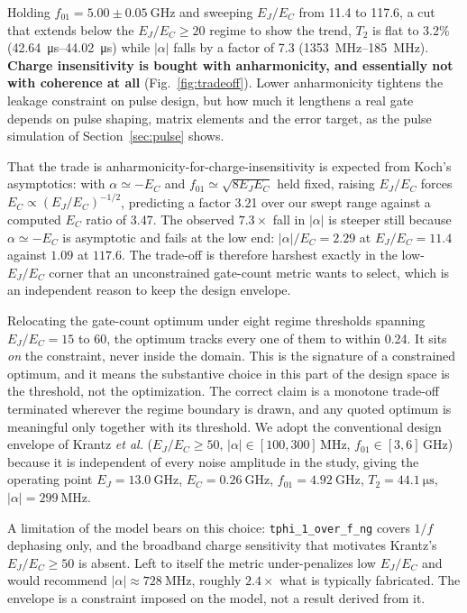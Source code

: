 \documentclass{SciPost}
\begin{document}
Holding $f_{01} = 5.00 \pm \SI{0.05}{\giga\hertz}$ and sweeping $E_J/E_C$ from 11.4 to 117.6, a cut
that extends below the $E_J/E_C\ge20$ regime to show the trend,
$T_2$ is flat to 3.2\% (\SIrange{42.64}{44.02}{\micro\second}) while $|\alpha|$ falls by a
factor of 7.3 (\SIrange{1353}{185}{\mega\hertz}). \textbf{Charge insensitivity is bought with anharmonicity, and essentially not with coherence at
all} (Fig.~\ref{fig:tradeoff}). Lower anharmonicity tightens the leakage constraint on pulse design,
but how much it lengthens a real gate depends on pulse shaping, matrix elements and the error target,
as the pulse simulation of Section~\ref{sec:pulse} shows.

That the trade is anharmonicity-for-charge-insensitivity is expected from Koch's asymptotics:
with $\alpha \simeq -E_C$ and $f_{01} \simeq \sqrt{8E_JE_C}$ held fixed, raising $E_J/E_C$
forces $E_C \propto (E_J/E_C)^{-1/2}$, predicting a factor 3.21 over our swept range against a
computed $E_C$ ratio of 3.47. The observed $7.3\times$ fall in $|\alpha|$ is steeper still
because $\alpha \simeq -E_C$ is asymptotic and fails at the low end: $|\alpha|/E_C = 2.29$ at
$E_J/E_C = 11.4$ against $1.09$ at $117.6$. The trade-off is therefore harshest exactly in the
low-$E_J/E_C$ corner that an unconstrained gate-count metric wants to select, which is an
independent reason to keep the design envelope.

Relocating the gate-count optimum under eight regime thresholds spanning $E_J/E_C = 15$ to
60, the optimum tracks every one of them to within 0.24. It sits \emph{on} the constraint,
never inside the domain. This is the signature of a constrained optimum, and it means the
substantive choice in this part of the design space is the threshold, not the optimization. The correct claim is a monotone trade-off terminated wherever the
regime boundary is drawn, and any quoted optimum is meaningful only together with its
threshold. We adopt the conventional design envelope of Krantz \emph{et al.} ($E_J/E_C \ge 50$, $|\alpha| \in
[100,300]$\,MHz, $f_{01} \in [3,6]$\,GHz)~\cite{krantz2019} because it is independent of every
noise amplitude in the study, giving the operating point $E_J = \SI{13.0}{\giga\hertz}$,
$E_C = \SI{0.26}{\giga\hertz}$, $f_{01} = \SI{4.92}{\giga\hertz}$,
$T_2 = \SI{44.1}{\micro\second}$, $|\alpha| = \SI{299}{\mega\hertz}$.

A limitation of the model bears on this choice: \texttt{tphi\_1\_over\_f\_ng} covers $1/f$
dephasing only, and the broadband charge sensitivity that motivates Krantz's
$E_J/E_C \ge 50$ is absent. Left to itself the metric under-penalizes low $E_J/E_C$ and would
recommend $|\alpha| \approx \SI{728}{\mega\hertz}$, roughly $2.4\times$ what is typically fabricated.
The envelope is a constraint imposed on the model, not a result derived from it.
\end{document}
